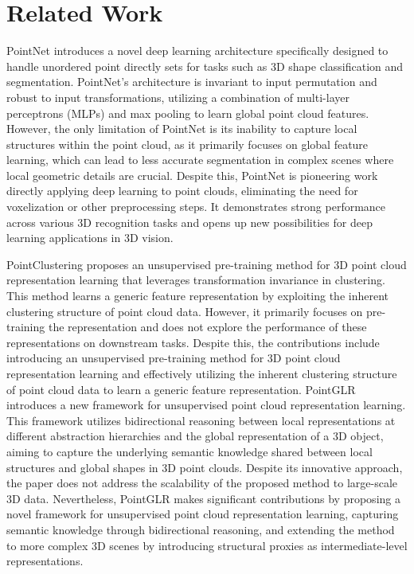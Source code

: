 \documentclass[../report.tex]{subfiles}
\begin{document}
    \section{Related Work}
    \label{sec:related_work}
 PointNet\cite{PointNet} introduces a novel deep learning architecture specifically designed to handle unordered point directly sets for tasks such as 3D shape classification and segmentation. PointNet's architecture is invariant to input permutation and robust to input transformations, utilizing a combination of multi-layer perceptrons (MLPs) and max pooling to learn global point cloud features. However, the only limitation of PointNet is its inability to capture local structures within the point cloud, as it primarily focuses on global feature learning, which can lead to less accurate segmentation in complex scenes where local geometric details are crucial. Despite this, PointNet is pioneering work directly applying deep learning to point clouds, eliminating the need for voxelization or other preprocessing steps. It demonstrates strong performance across various 3D recognition tasks and opens up new possibilities for deep learning applications in 3D vision.

PointClustering\cite{PointClustering} proposes an unsupervised pre-training method for 3D point cloud representation learning that leverages transformation invariance in clustering. This method learns a generic feature representation by exploiting the inherent clustering structure of point cloud data. However, it primarily focuses on pre-training the representation and does not explore the performance of these representations on downstream tasks. Despite this, the contributions include introducing an unsupervised pre-training method for 3D point cloud representation learning and effectively utilizing the inherent clustering structure of point cloud data to learn a generic feature representation.
PointGLR\cite{PointGLR} introduces a new framework for unsupervised point cloud representation learning. This framework utilizes bidirectional reasoning between local representations at different abstraction hierarchies and the global representation of a 3D object, aiming to capture the underlying semantic knowledge shared between local structures and global shapes in 3D point clouds. Despite its innovative approach, the paper does not address the scalability of the proposed method to large-scale 3D data. Nevertheless, PointGLR makes significant contributions by proposing a novel framework for unsupervised point cloud representation learning, capturing semantic knowledge through bidirectional reasoning, and extending the method to more complex 3D scenes by introducing structural proxies as intermediate-level representations.
\end{document}
